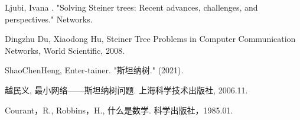 \documentclass{SCIS2022cn}
\begin{document}
\begin{thebibliography}{99}

     Ljubi, Ivana . "Solving Steiner trees: Recent advances, challenges, and perspectives." Networks. 

     Dingzhu Du, Xiaodong Hu, Steiner Tree Problems in Computer Communication Networks, World Scientific, 2008.

     ShaoChenHeng, Enter-tainer. "斯坦纳树." (2021). 

     越民义, 最小网络——斯坦纳树问题. 上海科学技术出版社, 2006.11.

     Courant，R., Robbins，H., 什么是数学. 科学出版社，1985.01.

\end{thebibliography}

\end{document}
